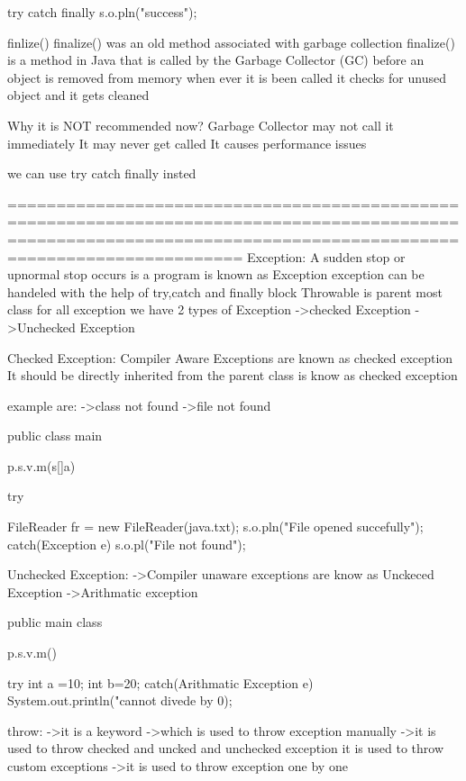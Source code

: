 {         try{
         }catch{
         }finally{
          s.o.pln("success");
          }

finlize()
finalize() was an old method associated with garbage collection
      finalize() is a method in Java that is called by the Garbage Collector (GC) before an object is removed from memory
          when ever it is been called it checks for unused object and it gets cleaned

Why it is NOT recommended now?
          Garbage Collector may not call it immediately
          It may never get called
          It causes performance issues

we can use try catch finally insted

==================================================================================================================================================================
Exception:
          A sudden stop or upnormal stop occurs is a program is known as Exception
          exception can be handeled with the help of try,catch and finally block
          Throwable is parent most class for all exception 
          we have 2 types of Exception
                    ->checked Exception
                    ->Unchecked Exception

Checked Exception:
          Compiler Aware Exceptions are known as checked exception
          It should be directly inherited from the parent class is know as checked exception

          example are:
                    ->class not found
                    ->file not found

          public class main{
                    p.s.v.m(s[]a){
                    try{
                       FileReader fr = new FileReader(java.txt);
                       s.o.pln("File opened succefully");
                       catch(Exception e){
                        s.o.pl("File not found");
                        }

Unchecked Exception:
          ->Compiler unaware exceptions are know as Unckeced Exception
          ->Arithmatic exception

          public main class{
                     p.s.v.m(){
                     try{
                      int a =10;
                      int b=20;
                      }catch(Arithmatic Exception e){
                        System.out.println("cannot divede by 0);
                        }


throw:
          ->it is a keyword 
          ->which is used to throw exception manually
          ->it is used to throw checked and uncked and unchecked exception it is used to throw custom exceptions
          ->it is used to throw exception one by one
          
}}}}}}
